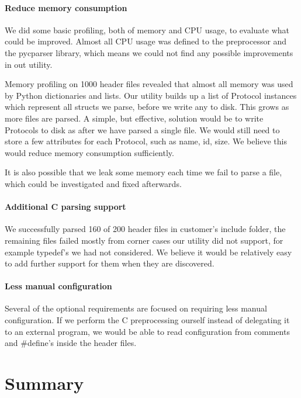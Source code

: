 \paragraph{Reduce memory consumption}
We did some basic profiling, both of memory and CPU usage, to evaluate what
could be improved. Almost all CPU usage was defined to the preprocessor and
the pycparser library, which means we could not find any possible improvements
in out utility.

Memory profiling on 1000 header files revealed that almost all memory was used
by Python dictionaries and lists. Our utility builds up a list of Protocol
instances which represent all structs we parse, before we write any to disk.
This grows as more files are parsed. A simple, but effective, solution would
be to write Protocols to disk as after we have parsed a single file. We would
still need to store a few attributes for each Protocol, such as name, id,
size. We believe this would reduce memory consumption sufficiently.

It is also possible that we leak some memory each time we fail to parse a
file, which could be investigated and fixed afterwards.

\paragraph{Additional C parsing support}
We successfully parsed 160 of 200 header files in customer's include folder,
the remaining files failed mostly from corner cases our utility did not
support, for example typedef's we had not considered. We believe it would be
relatively easy to add further support for them when they are discovered.

\paragraph{Less manual configuration}
Several of the optional requirements are focused on requiring less manual
configuration. If we perform the C preprocessing ourself instead of delegating
it to an external program, we would be able to read configuration from
comments and \#define's inside the header files.


\section{Summary}

